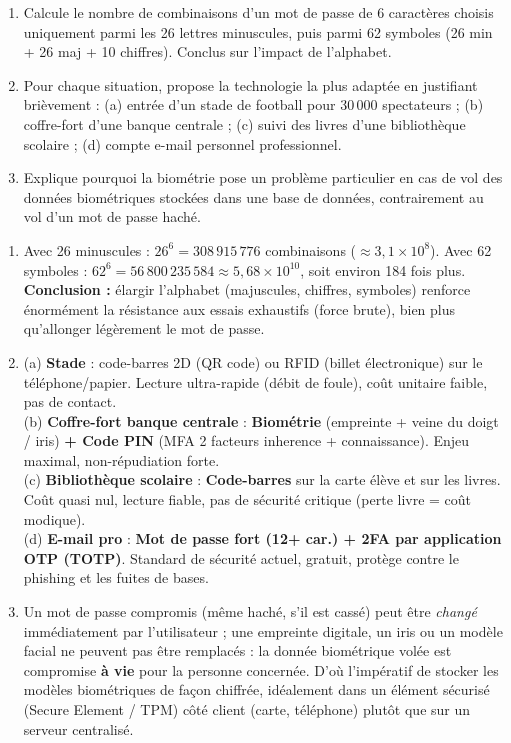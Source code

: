 \documentclass[11pt]{article}
\begin{document}
\begin{exercice}
\begin{enumerate}
  \item Calcule le nombre de combinaisons d'un mot de passe de 6 caractères choisis uniquement parmi les 26 lettres minuscules, puis parmi 62 symboles (26 min + 26 maj + 10 chiffres). Conclus sur l'impact de l'alphabet.
  \item Pour chaque situation, propose la technologie la plus adaptée en justifiant brièvement : (a) entrée d'un stade de football pour 30\,000 spectateurs ; (b) coffre-fort d'une banque centrale ; (c) suivi des livres d'une bibliothèque scolaire ; (d) compte e-mail personnel professionnel.
  \item Explique pourquoi la biométrie pose un problème particulier en cas de vol des données biométriques stockées dans une base de données, contrairement au vol d'un mot de passe haché.
\end{enumerate}
\end{exercice}

\begin{corrige}[Exercice]
\begin{enumerate}
  \item Avec 26 minuscules : $26^{6} = 308\,915\,776$ combinaisons ($\approx 3,1 \times 10^8$). Avec 62 symboles : $62^{6} = 56\,800\,235\,584 \approx 5{,}68 \times 10^{10}$, soit environ 184 fois plus. \textbf{Conclusion :} élargir l'alphabet (majuscules, chiffres, symboles) renforce énormément la résistance aux essais exhaustifs (force brute), bien plus qu'allonger légèrement le mot de passe.
  \item (a) \textbf{Stade} : code-barres 2D (QR code) ou RFID (billet électronique) sur le téléphone/papier. Lecture ultra-rapide (débit de foule), coût unitaire faible, pas de contact. \\
        (b) \textbf{Coffre-fort banque centrale} : \textbf{Biométrie} (empreinte + veine du doigt / iris) \textbf{+ Code PIN} (MFA 2 facteurs inherence + connaissance). Enjeu maximal, non-répudiation forte. \\
        (c) \textbf{Bibliothèque scolaire} : \textbf{Code-barres} sur la carte élève et sur les livres. Coût quasi nul, lecture fiable, pas de sécurité critique (perte livre = coût modique). \\
        (d) \textbf{E-mail pro} : \textbf{Mot de passe fort (12+ car.) + 2FA par application OTP (TOTP)}. Standard de sécurité actuel, gratuit, protège contre le phishing et les fuites de bases.
  \item Un mot de passe compromis (même haché, s'il est cassé) peut être \emph{changé} immédiatement par l'utilisateur ; une empreinte digitale, un iris ou un modèle facial ne peuvent pas être remplacés : la donnée biométrique volée est compromise \textbf{à vie} pour la personne concernée. D'où l'impératif de stocker les modèles biométriques de façon chiffrée, idéalement dans un élément sécurisé (Secure Element / TPM) côté client (carte, téléphone) plutôt que sur un serveur centralisé.
\end{enumerate}
\end{corrige}
\end{document}
